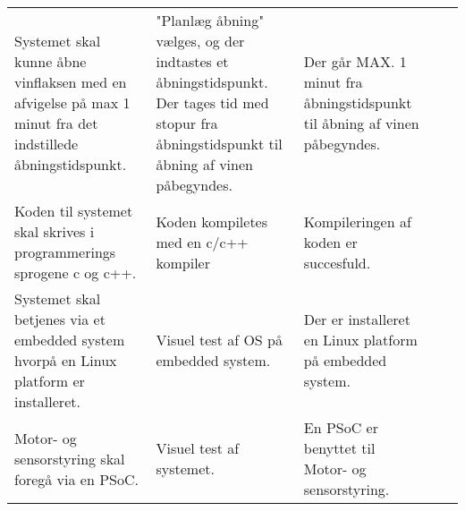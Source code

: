 \begin{longtable}{ p{2cm}  p{2cm}  p{2cm}  p{1.5cm} p{2cm} }
	Systemet skal kunne åbne vinflaksen med en afvigelse på max 1 minut fra det indstillede åbningstidspunkt.& "Planlæg åbning" vælges, og der indtastes et åbningstidspunkt. Der tages tid med stopur fra åbningstidspunkt til åbning af vinen påbegyndes.& Der går MAX. 1 minut fra åbningstidspunkt til åbning af vinen påbegyndes. & &\\ 
	  
	Koden til systemet skal skrives i programmerings sprogene c og c++.& Koden kompiletes med en c/c++ kompiler& Kompileringen af koden er succesfuld. & &\\ 
	
	Systemet skal betjenes via et embedded system hvorpå en Linux platform er installeret.& Visuel test af OS på embedded system.& Der er installeret en Linux platform på embedded system. & &\\ 
	
	Motor- og sensorstyring skal foregå via en PSoC.& Visuel test af systemet.& En PSoC er benyttet til Motor- og sensorstyring.& & \\  



\end{longtable}
